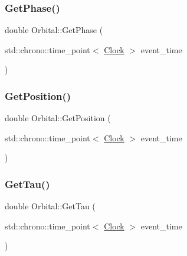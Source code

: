 \mbox{\label{classOrbital_ad891e4a65c01e94c72ad36cda114cc2a}} 
\subsubsection{\texorpdfstring{Get\+Phase()}{GetPhase()}}
{\footnotesize\ttfamily double Orbital\+::\+Get\+Phase (\begin{DoxyParamCaption}\item[{std\+::chrono\+::time\+\_\+point$<$ \mbox{\hyperlink{universe_8h_a0ef8d951d1ca5ab3cfaf7ab4c7a6fd80}{Clock}} $>$}]{event\+\_\+time }\end{DoxyParamCaption})\hspace{0.3cm}{\ttfamily [inline]}}

\mbox{\label{classOrbital_aea872758f844534806a638080a39507e}} 
\subsubsection{\texorpdfstring{Get\+Position()}{GetPosition()}}
{\footnotesize\ttfamily double Orbital\+::\+Get\+Position (\begin{DoxyParamCaption}\item[{std\+::chrono\+::time\+\_\+point$<$ \mbox{\hyperlink{universe_8h_a0ef8d951d1ca5ab3cfaf7ab4c7a6fd80}{Clock}} $>$}]{event\+\_\+time }\end{DoxyParamCaption})\hspace{0.3cm}{\ttfamily [inline]}}

\mbox{\label{classOrbital_aeb7758cc920cb862fdc33374c26cb585}} 
\subsubsection{\texorpdfstring{Get\+Tau()}{GetTau()}}
{\footnotesize\ttfamily double Orbital\+::\+Get\+Tau (\begin{DoxyParamCaption}\item[{std\+::chrono\+::time\+\_\+point$<$ \mbox{\hyperlink{universe_8h_a0ef8d951d1ca5ab3cfaf7ab4c7a6fd80}{Clock}} $>$}]{event\+\_\+time }\end{DoxyParamCaption})\hspace{0.3cm}{\ttfamily [inline]}}

